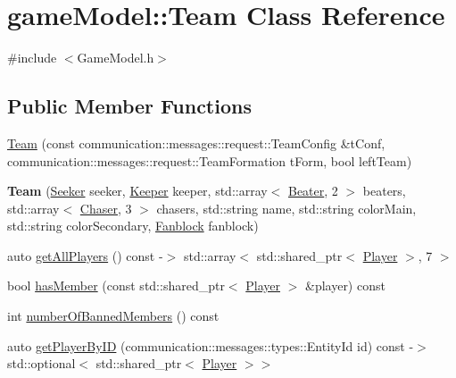 \hypertarget{classgame_model_1_1_team}{\section{game\-Model\-:\-:Team Class Reference}
\label{classgame_model_1_1_team}
}


{\ttfamily \#include $<$Game\-Model.\-h$>$}

\subsection*{Public Member Functions}
\begin{DoxyCompactItemize}
\item 
\hyperlink{classgame_model_1_1_team_a6254ef77ea2fd282421d1508457ba53f}{Team} (const communication\-::messages\-::request\-::\-Team\-Config \&t\-Conf, communication\-::messages\-::request\-::\-Team\-Formation t\-Form, bool left\-Team)
\item 
\hypertarget{classgame_model_1_1_team_a52a305b144f89973b3500335502c0cef}{{\bfseries Team} (\hyperlink{classgame_model_1_1_seeker}{Seeker} seeker, \hyperlink{classgame_model_1_1_keeper}{Keeper} keeper, std\-::array$<$ \hyperlink{classgame_model_1_1_beater}{Beater}, 2 $>$ beaters, std\-::array$<$ \hyperlink{classgame_model_1_1_chaser}{Chaser}, 3 $>$ chasers, std\-::string name, std\-::string color\-Main, std\-::string color\-Secondary, \hyperlink{classgame_model_1_1_fanblock}{Fanblock} fanblock)}\label{classgame_model_1_1_team_a52a305b144f89973b3500335502c0cef}

\item 
auto \hyperlink{classgame_model_1_1_team_a3add38a878f50ed9a847b01d996be4ca}{get\-All\-Players} () const -\/$>$ std\-::array$<$ std\-::shared\-\_\-ptr$<$ \hyperlink{classgame_model_1_1_player}{Player} $>$, 7 $>$
\item 
bool \hyperlink{classgame_model_1_1_team_af8385c0f7f70af2aa82d082a3b6c64d3}{has\-Member} (const std\-::shared\-\_\-ptr$<$ \hyperlink{classgame_model_1_1_player}{Player} $>$ \&player) const 
\item 
int \hyperlink{classgame_model_1_1_team_aa8c1000d942a20cf9a8de559338ff869}{number\-Of\-Banned\-Members} () const 
\item 
auto \hyperlink{classgame_model_1_1_team_a1e22097a639d37333176354a83ab3038}{get\-Player\-By\-I\-D} (communication\-::messages\-::types\-::\-Entity\-Id id) const -\/$>$ std\-::optional$<$ std\-::shared\-\_\-ptr$<$ \hyperlink{classgame_model_1_1_player}{Player} $>$$>$
\end{DoxyCompactItemize}
